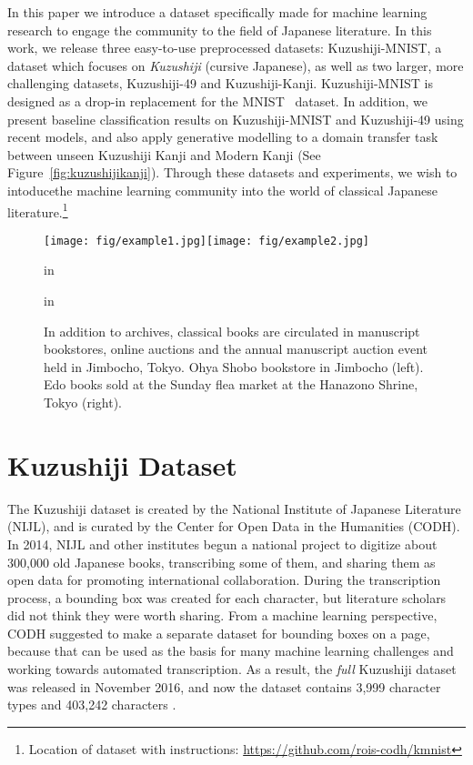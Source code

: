 \documentclass{article}
\begin{document}
\begin{CJK}{UTF8}{min}
In this paper we introduce a dataset specifically made for machine learning research to engage the community to the field of Japanese literature. In this work, we release three easy-to-use preprocessed datasets: Kuzushiji-MNIST, a dataset which focuses on \textit{Kuzushiji} (cursive Japanese), as well as two larger, more challenging datasets, Kuzushiji-49 and Kuzushiji-Kanji. Kuzushiji-MNIST is designed as a drop-in replacement for the MNIST~\cite{lecun1998mnist} dataset.
In addition, we present baseline classification results on Kuzushiji-MNIST and Kuzushiji-49 using recent models, and also apply generative modelling to a domain transfer task between unseen Kuzushiji Kanji and Modern Kanji (See Figure~\ref{fig:kuzushijikanji}). Through these datasets and experiments, we wish to intoducethe machine learning community into the world of classical Japanese literature.\footnote{Location of dataset with instructions: \url{https://github.com/rois-codh/kmnist}}
\begin{figure}[!htb]
\vskip -0.05in
\begin{center}
\centerline{\texttt{[image: fig/example1.jpg]}\texttt{[image: fig/example2.jpg]}}
 in
\caption{In addition to archives, classical books are circulated in manuscript bookstores, online auctions and the annual manuscript auction event held in Jimbocho, Tokyo. Ohya Shobo bookstore in Jimbocho (left). Edo books sold at the Sunday flea market at the Hanazono Shrine, Tokyo (right).}
\label{fig:source_examples}
\end{center}
 in
\end{figure}

\section{Kuzushiji Dataset}

The Kuzushiji dataset is created by the National Institute of Japanese Literature (NIJL), and is curated by the Center for Open Data in the Humanities (CODH). In 2014, NIJL and other institutes begun a national project to digitize about 300,000 old Japanese books, transcribing some of them, and sharing them as open data for promoting international collaboration. During the transcription process, a bounding box was created for each character, but literature scholars did not think they were worth sharing. From a machine learning perspective, CODH suggested to make a separate dataset for bounding boxes on a page, because that can be used as the basis for many machine learning challenges and working towards automated transcription. As a result, the \textit{full} Kuzushiji dataset was released in November 2016, and now the dataset contains 3,999 character types and 403,242 characters \cite{codh_pmjt}.


\end{CJK}
\end{document}
